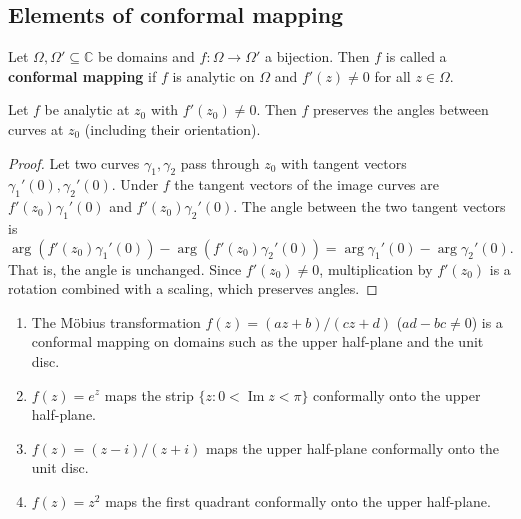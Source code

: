 \subsection{Elements of conformal mapping}

\begin{definition}\label{def:ca_conformal_map}
Let $\Omega, \Omega' \subseteq \mathbb{C}$ be domains and $f: \Omega \to \Omega'$ a bijection. Then $f$ is called a \textbf{conformal mapping} if $f$ is analytic on $\Omega$ and $f'(z) \neq 0$ for all $z \in \Omega$.
\end{definition}

\begin{proposition}\label{prop:ca_conformal_angle_preserving}
Let $f$ be analytic at $z_0$ with $f'(z_0) \neq 0$. Then $f$ preserves the angles between curves at $z_0$ (including their orientation).
\end{proposition}

\begin{proof}
Let two curves $\gamma_1, \gamma_2$ pass through $z_0$ with tangent vectors $\gamma_1'(0), \gamma_2'(0)$. Under $f$ the tangent vectors of the image curves are $f'(z_0) \gamma_1'(0)$ and $f'(z_0) \gamma_2'(0)$. The angle between the two tangent vectors is
\[
\arg(f'(z_0) \gamma_1'(0)) - \arg(f'(z_0) \gamma_2'(0)) = \arg \gamma_1'(0) - \arg \gamma_2'(0).
\]
That is, the angle is unchanged. Since $f'(z_0) \neq 0$, multiplication by $f'(z_0)$ is a rotation combined with a scaling, which preserves angles.
\end{proof}

\begin{example}\label{ex:ca_conformal_examples}
\begin{enumerate}[label=(\roman*)]
    \item The Möbius transformation $f(z) = (az + b)/(cz + d)$ ($ad - bc \neq 0$) is a conformal mapping on domains such as the upper half-plane and the unit disc.
    \item $f(z) = e^z$ maps the strip $\{z : 0 < \operatorname{Im} z < \pi\}$ conformally onto the upper half-plane.
    \item $f(z) = (z - i)/(z + i)$ maps the upper half-plane conformally onto the unit disc.
    \item $f(z) = z^2$ maps the first quadrant conformally onto the upper half-plane.
\end{enumerate}
\end{example}

